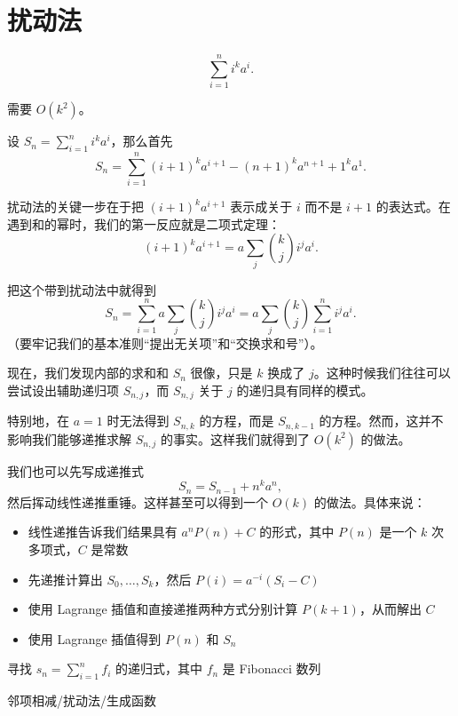 \section{扰动法}
    \begin{example}[数列求和]
        $$
        \sum_{i=1}^n i^ka^i.
        $$

        需要 $O(k^2)$。
    \end{example}
    \begin{solution}
    设 $S_n=\sum_{i=1}^n i^k a^i$，那么首先
    $$
    S_n=\sum_{i=1}^n (i+1)^k a^{i+1} - (n+1)^ka^{n+1}+1^ka^{1}.
    $$

    扰动法的关键一步在于把 $(i+1)^ka^{i+1}$ 表示成关于 $i$ 而不是 $i+1$ 的表达式。在遇到和的幂时，我们的第一反应就是二项式定理：
    $$
    (i+1)^ka^{i+1}=a\sum_j\binom{k}{j}i^ja^i.
    $$ 

    把这个带到扰动法中就得到
    $$
    S_n=\sum_{i=1}^n a\sum_j\binom{k}{j}i^ja^i=a\sum_j\binom{k}{j}\sum_{i=1}^n i^ja^i. 
    $$
    （要牢记我们的基本准则“提出无关项”和“交换求和号”）。

    现在，我们发现内部的求和和 $S_n$ 很像，只是 $k$ 换成了 $j$。这种时候我们往往可以尝试设出辅助递归项 $S_{n,j}$，而 $S_{n,j}$ 关于 $j$ 的递归具有同样的模式。

    特别地，在 $a=1$ 时无法得到 $S_{n,k}$ 的方程，而是 $S_{n,k-1}$ 的方程。然而，这并不影响我们能够递推求解 $S_{n,j}$ 的事实。这样我们就得到了 $O(k^2)$ 的做法。
    \end{solution}
    \begin{solution}[另解]
        我们也可以先写成递推式
        $$
        S_n=S_{n-1}+n^ka^n,
        $$
        然后挥动线性递推重锤。这样甚至可以得到一个 $O(k)$ 的做法。具体来说：
        \begin{itemize}
            \item 线性递推告诉我们结果具有 $a^nP(n)+C$ 的形式，其中 $P(n)$ 是一个 $k$ 次多项式，$C$ 是常数
            \item 先递推计算出 $S_0,\ldots,S_k$，然后 $P(i)=a^{-i}(S_i-C)$
            \item 使用 Lagrange 插值和直接递推两种方式分别计算 $P(k+1)$，从而解出 $C$
            \item 使用 Lagrange 插值得到 $P(n)$ 和 $S_n$
        \end{itemize}
    \end{solution}

    \begin{example}[含有求和的递归]
    寻找 $s_n=\sum_{i=1}^n f_i$ 的递归式，其中 $f_n$ 是 Fibonacci 数列
\end{example}
\begin{solution}
    邻项相减/扰动法/生成函数
\end{solution}


